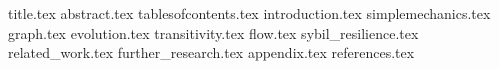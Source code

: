 \documentclass[11pt]{llncs}
\begin{document}
  {title.tex}
  \thispagestyle{plain}
  {abstract.tex}
  \clearpage
  {tablesofcontents.tex}
  {introduction.tex}
  {simplemechanics.tex}
  {graph.tex}
  {evolution.tex}
  {transitivity.tex}
  {flow.tex}
  {sybil_resilience.tex}
  {related_work.tex}
  {further_research.tex}
  {appendix.tex}
  {references.tex}
\end{document}
